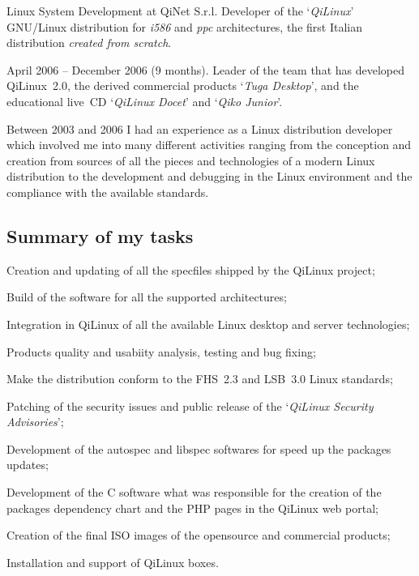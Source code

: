 
\bigskip
{}
   {Linux System Development at QiNet S.r.l.}
Developer of the `{\it QiLinux\/}' GNU/Linux distribution for {\it i586} and
{\it ppc} architectures, the first Italian distribution
{\it created from scratch}.

\noindent
April 2006 -- December 2006 (9 months). 
Leader of the team that has developed QiLinux~2.0, the derived commercial 
products `{\it Tuga Desktop\/}', and the educational live~CD 
`{\it QiLinux Docet\/}' and `{\it Qiko Junior\/}'.

Between 2003 and 2006 I had an experience as a Linux distribution developer 
which involved me into many different activities ranging from the conception
and creation from sources of all the pieces and technologies of a modern Linux
distribution to the development and debugging in the Linux environment and 
the compliance with the available standards.

\subsection{Summary of my tasks}

\item{\bdot} Creation and updating of all the specfiles shipped by the QiLinux project;
\item{\bdot} Build of the software for all the supported architectures;
\item{\bdot} Integration in QiLinux of all the available Linux desktop and server technologies;
\item{\bdot} Products quality and usabiity analysis, testing and bug fixing;
\item{\bdot} Make the distribution conform to the FHS~2.3 and LSB~3.0 Linux standards;
\item{\bdot} Patching of the security issues and public release of the 
   `{\it QiLinux Security Advisories\/}';
\item{\bdot} Development of the autospec and libspec softwares for speed up the packages updates;
\item{\bdot} Development of the C software what was responsible for the creation
   of the packages dependency chart and the PHP pages in the QiLinux web portal;
\item{\bdot} Creation of the final ISO images of the opensource and commercial products;
\item{\bdot} Installation and support of QiLinux boxes.

